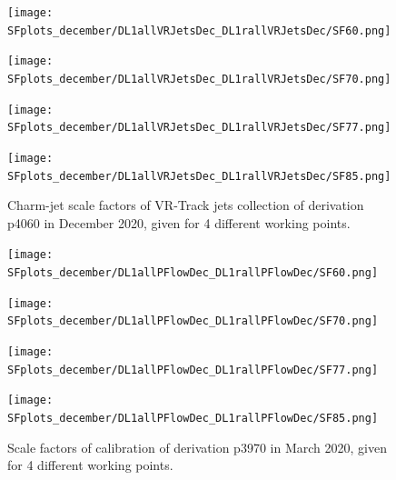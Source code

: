 \documentclass[letterpaper,12pt]{article}
\begin{document}
\begin{figure}[H]
\begin{minipage}[b]{.45\textwidth}
\centering
\texttt{[image: SFplots\_december/DL1allVRJetsDec\_DL1rallVRJetsDec/SF60.png]}
\end{minipage}\hfill
\begin{minipage}[b]{.45\textwidth}
\centering
\texttt{[image: SFplots\_december/DL1allVRJetsDec\_DL1rallVRJetsDec/SF70.png]}
\end{minipage}\hfill
\begin{minipage}[b]{.45\textwidth}
\centering
\texttt{[image: SFplots\_december/DL1allVRJetsDec\_DL1rallVRJetsDec/SF77.png]}
\end{minipage}\hfill
\begin{minipage}[b]{.45\textwidth}
\centering
\texttt{[image: SFplots\_december/DL1allVRJetsDec\_DL1rallVRJetsDec/SF85.png]}
\end{minipage}
\caption{Charm-jet scale factors of VR-Track jets collection of derivation p4060 in December 2020, given for 4 different working points.} \label{fig:Dec_SF_VRJets}
\end{figure}



\iffalse
\begin{figure}[H]
\begin{minipage}[b]{.45\textwidth}
\centering
\texttt{[image: SFplots\_december/DL1allPFlowDec\_DL1rallPFlowDec/SF60.png]}
\end{minipage}\hfill
\begin{minipage}[b]{.45\textwidth}
\centering
\texttt{[image: SFplots\_december/DL1allPFlowDec\_DL1rallPFlowDec/SF70.png]}
\end{minipage}\hfill
\begin{minipage}[b]{.45\textwidth}
\centering
\texttt{[image: SFplots\_december/DL1allPFlowDec\_DL1rallPFlowDec/SF77.png]}
\end{minipage}\hfill
\begin{minipage}[b]{.45\textwidth}
\centering
\texttt{[image: SFplots\_december/DL1allPFlowDec\_DL1rallPFlowDec/SF85.png]}
\end{minipage}
\caption{Scale factors of calibration of derivation p3970 in March 2020, given for  4 different working points.} \label{fig:March}
\end{figure}
\end{document}
